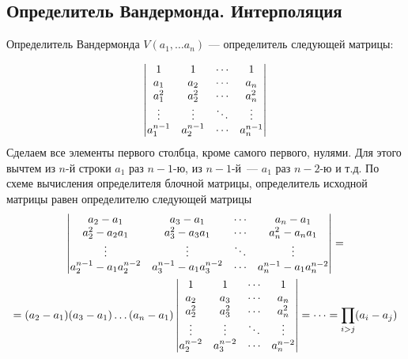 




\subsection{Определитель Вандермонда. Интерполяция}
\label{sle:interpolation}

Определитель Вандермонда $V(a_1,\dots a_n)$ --- определитель следующей матрицы:

$$\begin{vmatrix}
1 &    1 & \cdots & 1 \\
a_{1} & a_{2} & \cdots & a_{n} \\
a_{1}^2 & a_{2}^2 & \cdots & a_{n}^2 \\
\vdots & \vdots & \ddots & \vdots \\
a_{1}^{n-1} & a_{2}^{n-1} & \cdots & a_{n}^{n-1}
\end{vmatrix}
$$
Сделаем все элементы первого столбца, кроме самого первого, нулями. Для этого вычтем из $n$-й строки $a_1$ раз $n-1$-ю, из $n-1$-й~--- $a_1$ раз ${n-2}$-ю и т.д. По схеме вычисления определителя блочной матрицы, определитель исходной матрицы равен определителю следующей матрицы
\begin{multline*}
\begin{vmatrix}
a_2-a_1 &    a_3-a_1 & \cdots & a_n-a_1 \\
a_2^2-a_2a_1 & a_3^2-a_3a_1 & \cdots & a_n^2-a_na_1 \\
\vdots & \vdots & \ddots & \vdots \\
a_{2}^{n-1} - a_1a_2^{n-2} & a_{3}^{n-1} - a_1a_3^{n-2} & \cdots & a_{n}^{n-1}-a_1a_n^{n-2}
\end{vmatrix}=\\=(a_2-a_1)(a_3-a_1)\dots(a_n-a_1)\begin{vmatrix}
1 &    1 & \cdots & 1 \\
a_{2} & a_{3} & \cdots & a_{n} \\
a_{2}^2 & a_{3}^2 & \cdots & a_{n}^2 \\
\vdots & \vdots & \ddots & \vdots \\
a_{2}^{n-2} & a_{3}^{n-2} & \cdots & a_{n}^{n-2}
\end{vmatrix}=\dots=\prod_{i>j}(a_i-a_j)
\end{multline*}

